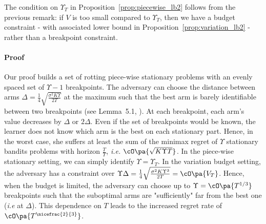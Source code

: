 The condition on $\Upsilon_T$ in Proposition~\ref{prop:piecewise_lb2} follows from the previous remark: if $V$ is too small compared to $\Upsilon_T$, then we have a budget constraint - with associated lower bound in Proposition~\ref{prop:variation_lb2} - rather than a breakpoint constraint.


\paragraph{Proof}
 Our proof builds a set of rotting piece-wise stationary problems with an evenly spaced set of $\Upsilon -1$ breakpoints. The adversary can choose the distance between arms $\Delta=\frac{1}{4} \sqrt{\frac{\sigma^{2} K \Upsilon}{2 T}}$ at the maximum such that the best arm is barely identifiable between two breakpoints (see Lemma~5.1, \citet{auer2002nonstochastic}). At each breakpoint, each arm's value decreases by $\Delta$ or $2\Delta$. Even if the set of breakpoints would be known, the learner does not know which arm is the best on each stationary part. Hence, in the worst case, she suffers at least the sum of the minimax regret of $\Upsilon$ stationary bandits problems with horizon $\frac{T}{\Upsilon}$, \textit{i.e.}  $\cO \pa{\sqrt{K\Upsilon T}}$. In the piece-wise stationary setting, we can simply identify $\Upsilon = \Upsilon_T$. In the variation budget setting, the adversary has a constraint over $\Upsilon \Delta = \frac{1}{4} \sqrt{\frac{\sigma^{2} K \Upsilon^3}{2 T}}=  \cO\pa{V_T}$. Hence, when the budget is limited, the adversary can choose up to $\Upsilon = \cO\pa{ T^{1/3}}$ breakpoints such that the suboptimal arms are "sufficiently" far from the best one (\textit{i.e} at $\Delta$). This dependence on $T$ leads to the increased regret rate of $\cO\pa{T^{\nicefrac{2}{3}}}$.
 
